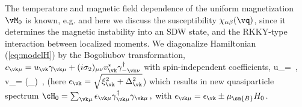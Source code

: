 \documentclass[aps,prl,twocolumn,showpacs,amsmath,amssymb]{revtex4-1}
\begin{document}
The temperature and magnetic field dependence of the uniform magnetization $\vM_0$
is known, e.g.\cite{Vorontsov06_FLfflo}
and here we discuss the susceptibility $\chi_{\alpha\beta}(\vq)$, since 
it determines the magnetic instability into 
an SDW state, 
and the RKKY-type interaction between localized moments. 
We diagonalize Hamiltonian (\ref{eq:modelH}) by the 
Bogoliubov transformation, 
$c_{\vk \mu} = u_\vk \gamma_{\vk \mu} + (i\sigma_2)_{\mu\nu} v_\vk^* \gamma^\dag_{-\vk \nu} $
%
with spin-independent coefficients, 
\be
u_{\vk}=  \,, \quad 
v_{\vk}= \sgn(\Delta_\vk) \,,
\ee
(here $\epsilon_\vk = \sqrt{ \xi_{\vk}^2 + \Delta_{\vk}^2 }$) 
which results in new quasiparticle spectrum 
$
\cH_0 = \sum_{\vk \mu} \epsilon_{\vk \mu} \gamma^\dag_{\vk \mu} \gamma_{\vk \mu} \,,
$ with 
$
\epsilon_{\vk\mu} =\epsilon_\vk \pm \mu_\sm{B} H_0 \,.
$
\end{document}
